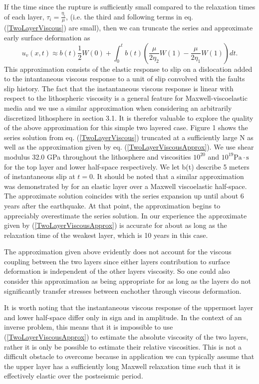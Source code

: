 \documentclass[12pt]{article}
\begin{document}
If the time since the rupture is sufficiently small compared to the
relaxation times of each layer, $\tau_i=\frac{\eta_i}{\mu}$, (i.e. the third and
following terms in eq. (\ref{TwoLayerViscous}) are small), then we can
truncate the series and approximate early surface deformation as
\begin{equation}\label{TwoLayerViscousApprox}
 u_v(x,t) \approx b(t)\frac{1}{2}W(0) + 
          \int_0^t b(t)\left(\frac{\mu}{2\eta_2}W(1) - \frac{\mu}{2\eta_1}W(1)\right)dt.
\end{equation} 
This approximation consists of the elastic response to slip on a
dislocation added to the intantaneous viscous response to a unit of
slip convolved with the faults slip history.  The fact that the
instantaneous viscous response is linear with respect to the
lithospheric viscosity is a general feature for Maxwell-viscoelastic
media and we use a similar approximation when considering an
arbitrarily discretized lithosphere in section 3.1.  It is therefor
valuable to explore the quality of the above approximation for this
simple two layered case. Figure 1 shows the series solution from
eq. (\ref{TwoLayerViscous}) truncated at a sufficiently large N as
well as the approximation given by eq. (\ref{TwoLayerViscousApprox}).
We use shear modulus 32.0 GPa throughout the lithosphere and
viscosities $10^{20}$ and $10^{19} \mathrm{Pa}\cdot\mathrm{s}$ for the
top layer and lower half-space respectively.  We let b(t) describe 5
meters of instantaneous slip at $t=0$.  It should be noted that a
similar approximation was demonstrated by \citet{S2010} for an elastic
layer over a Maxwell viscoelastic half-space.  The approximate
solution coincides with the series expansion up until about 6 years
after the earthquake.  At that point, the approximation begins to
appreciably overestimate the series solution.  In our experience the
approximate given by (\ref{TwoLayerViscousApprox}) is accurate for
about as long as the relaxation time of the weakest layer, which is 10
years in this case.

The approximation given above evidently does not account for the
viscous coupling between the two layers since either layers
contribution to surface deformation is independent of the other layers
viscosity.  So one could also consider this approximation as being
appropriate for as long as the layers do not significantly transfer
stresses between eachother through viscous deformation.

It is worth noting that the instantaneous viscous response of the
uppermost layer and lower half-space differ only in sign and in
amplitude.  In the context of an inverse problem, this means that it
is impossible to use (\ref{TwoLayerViscousApprox}) to estimate the
absolute viscosity of the two layers, rather it is only be possible to
estimate their relative viscosities.  This is not a difficult obstacle
to overcome because in application we can typically assume that the
upper layer has a sufficiently long Maxwell relaxation time such that
it is effectively elastic over the postseismic period.
\end{document}
